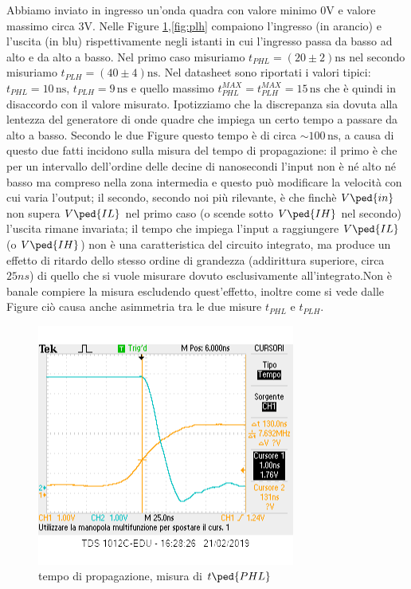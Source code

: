 \documentclass[10pt,a4paper]{article}
\begin{document}
Abbiamo inviato in ingresso un'onda quadra con valore minimo $0 \si{\volt}$  e valore massimo circa $3 \si{\volt}$. Nelle Figure \ref{fig:phl},\ref{fig:plh}  compaiono l'ingresso (in arancio) e l'uscita (in blu) rispettivamente negli istanti in cui l'ingresso passa da basso ad alto e da alto a basso.
Nel primo caso misuriamo $t_{PHL}= (20\pm 2 )\si{\nano\second}$ nel secondo  misuriamo $t_{PLH} = (40\pm 4)\si{\nano \second}$.
Nel datasheet sono riportati i valori tipici: $t_{PHL}= 10 \,\si{\nano\second}$, $t_{PLH} = 9\,\si{\nano \second}$ e quello massimo $t_{PHL}^{MAX}= t_{PLH}^{MAX}= 15\, \si{\nano\second}$ che è quindi in disaccordo con il valore misurato. Ipotizziamo  che la discrepanza sia dovuta alla lentezza del generatore di onde quadre che impiega un certo tempo a passare da alto a basso.
Secondo le due Figure questo tempo è di circa $\sim 100 \, \si {\nano\second}$, a causa di questo due fatti incidono sulla misura del tempo di propagazione: il primo è che per un intervallo dell'ordine delle decine di nanosecondi l'input non è né alto né basso ma compreso nella zona intermedia e questo può modificare la velocità con cui varia l'output; il secondo, secondo noi più rilevante, è che finchè $V\ped{in}$ non supera $V\ped{IL}$ nel primo caso (o scende sotto $V\ped{IH}$ nel secondo) l'uscita rimane invariata; il  tempo che  impiega l'input a raggiungere $V\ped{IL}$ (o  $V\ped{IH}$) non è una caratteristica del circuito integrato, ma produce un effetto di ritardo dello stesso ordine di grandezza (addirittura superiore, circa $25ns$) di quello che si vuole misurare dovuto esclusivamente all'integrato.Non è banale  compiere la misura escludendo quest'effetto, inoltre come si vede dalle Figure ciò causa anche asimmetria tra le due misure  $t_{PHL}$ e  $t_{PLH}$.
\begin{figure}[h]
			\centering
			\includegraphics[scale=0.85]{schifo1}
			\caption{tempo di propagazione, misura di $t\ped{PHL}$}
			\label{fig:phl}
\end{figure}
\end{document}
